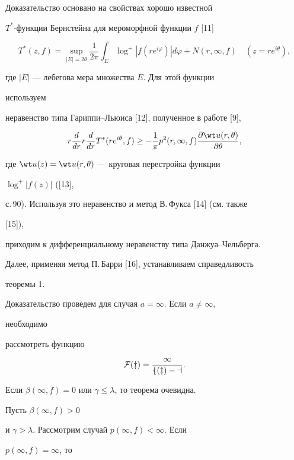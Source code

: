  


Доказательство основано на свойствах хорошо известной 


$T^*$-функции Бернстейна для мероморфной функции $f$ [11] 


$$ 


T^*(z,f)=\sup_{|E|=2\theta}\frac{1}{2\pi} 


\int_E \log^+|f(r e^{i\varphi})|d\varphi+ 


N(r,\infty,f)\quad (z=r e^{i\theta}), 


$$ 


где $|E|$ --- лебегова мера множества $E$. Для этой функции 


используем 


неравенство типа Га\-рип\-пи--Льюиса [12], полученное в работе [9],


$$ 


r\frac{d}{dr}r\frac{d}{dr}T^*(r e^{i\theta},f)\ge 


-\frac{1}{\pi}p^2(r,\infty,f) 


\frac{\partial\wt u(r,\theta)}{\partial\theta}, 


$$ 


где $\wt u(z)=\wt u(r,\theta)$ --- круговая перестройка функции 


$\log^+|f(z)|$ ([13], 


с.\,90). Используя это неравенство и метод В.\,Фукса [14] (см. также 


[15]), 


приходим к дифференциальному неравенству типа Данжуа--Чельберга. 


Далее, применяя метод П.\,Барри [16], устанавливаем справедливость 


теоремы 1. 


 


Доказательство проведем для случая $a=\infty$. Если $a\ne\infty$, 


необходимо 


рассмотреть функцию 


$$ 


\cal F(z)=\frac{1}{f(z)-a}. 


$$ 


Если $\beta(\infty,f)=0$ или $\gamma\le\lambda$, то теорема очевидна. 


Пусть $\beta(\infty,f)>0$ 


и $\gamma>\lambda$. Рассмотрим случай $p(\infty,f)<\infty$. Если 


$p(\infty,f)=\infty$, то 



